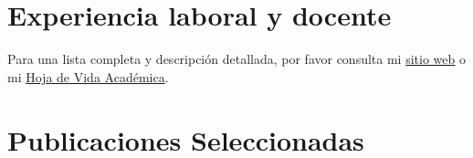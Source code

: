 \documentclass[11pt,a4paper,]{awesome-cv}
\begin{document}
\section{Experiencia laboral y
docente}\label{experiencia-laboral-y-docente}

Para una lista completa y descripción detallada, por favor consulta mi
\href{https://jdleongomez.info/es/profile/\#experience}{sitio web} o mi
\href{https://jdleongomez.github.io/JDL_CV/CV_esp/JDL_CV_es.pdf}{Hoja de
Vida Académica}.

\begin{cventries}
    \vspace{-4.0mm}
\end{cventries}

\section{Publicaciones Seleccionadas}\label{publicaciones-seleccionadas}
\end{document}
